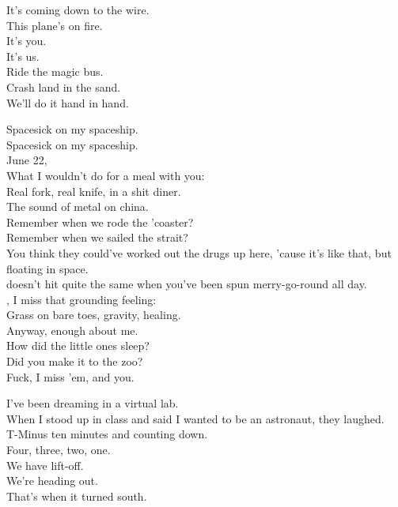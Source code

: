 
It's coming down to the wire. \\
This plane's on fire. \\
It's you. \\
It's us. \\
Ride the magic bus. \\
Crash land in the sand. \\
We'll do it hand in hand. \\





Spacesick on my spaceship. \\
Spacesick on my spaceship. \\

June 22, \\
What I wouldn't do for a meal with you: \\
Real fork, real knife, in a shit diner. \\
The sound of metal on china. \\
Remember when we rode the 'coaster? \\
Remember when we sailed the strait? \\
You think they could've worked out the drugs up here, 'cause it's like that, but floating in space. \\

 doesn't hit quite the same when you've been spun merry-go-round all day. \\
, I miss that grounding feeling: \\
Grass on bare toes, gravity, healing. \\
Anyway, enough about me. \\
How did the little ones sleep? \\
Did you make it to the zoo? \\
Fuck, I miss 'em, and you. \\


I've been dreaming in a virtual lab. \\
When I stood up in class and said I wanted to be an astronaut, they laughed. \\
T-Minus ten minutes and counting down. \\
Four, three, two, one. \\
We have lift-off. \\
We're heading out. \\
That's when it turned south. \\

